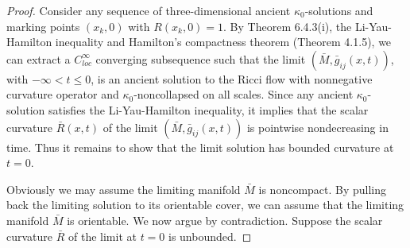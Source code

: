 \begin{proof}
Consider any sequence of three-dimensional ancient
$\kappa_0$-solutions and marking points $(x_k,0)$ with
$R(x_k,0)=1$. By Theorem 6.4.3(i), the Li-Yau-Hamilton inequality
and Hamilton's compactness theorem (Theorem 4.1.5), we can extract
a $C^\infty_{loc}$ converging subsequence such that the limit
$(\bar{M},\bar{g}_{ij}(x,t))$, with $-\infty <t \leq 0$, is an
ancient solution to the Ricci flow with nonnegative curvature
operator and $\kappa_0$-noncollapsed on all scales. Since any
ancient $\kappa_0$-solution satisfies the Li-Yau-Hamilton
inequality, it implies that the scalar curvature $\bar{R}(x,t)$ of
the limit $(\bar{M},\bar{g}_{ij}(x,t))$ is pointwise nondecreasing
in time. Thus it remains to show that the limit solution has
bounded curvature at $t=0$.

Obviously we may assume the limiting manifold $\bar{M}$ is
noncompact. By pulling back the limiting solution to its
orientable cover, we can assume that the limiting manifold
$\bar{M}$ is orientable. We now argue by contradiction. Suppose
the scalar curvature $\bar{R}$ of the limit at $t=0$ is unbounded.


\end{proof}
